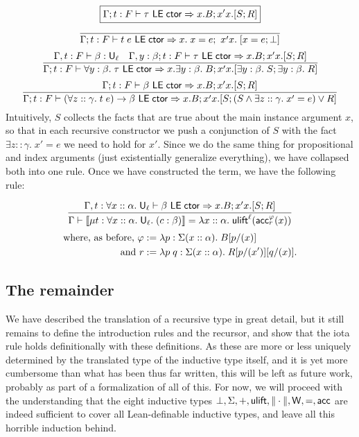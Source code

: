 $$\boxed{\Gamma;t:F\vdash \tau\LEctor\Rightarrow x.B;x'x.[S;R]}$$
$$\frac{}{\Gamma;t:F\vdash t\;e\LEctor\Rightarrow x.\;x=e;\ x'x.\;[x=e;\bot]}$$
$$\frac{\Gamma,t:F\vdash \beta:\U_\ell\quad \Gamma,y:\beta;t:F\vdash\tau\LEctor\Rightarrow x.B;x'x.[S;R]}
{\Gamma;t:F\vdash\forall y:\beta.\;\tau\LEctor\Rightarrow x.\exists y:\beta.\;B;x'x.[\exists y:\beta.\;S;\exists y:\beta.\;R]}$$
$$\frac{\Gamma;t:F\vdash\beta\LEctor\Rightarrow x.B;x'x.[S;R]}{\Gamma;t:F\vdash(\forall z::\gamma.\;t\;e)\to\beta\LEctor\Rightarrow x.B;x'x.[S;(S\land\exists z::\gamma.\;x'=e)\lor R]}$$
Intuitively, $S$ collects the facts that are true about the main instance argument $x$, so that in each recursive constructor we push a conjunction of $S$ with the fact $\exists z::\gamma.\;x'=e$ we need to hold for $x'$. Since we do the same thing for propositional and index arguments (just existentially generalize everything), we have collapsed both into one rule. Once we have constructed the term, we have the following rule:

$$\frac{\Gamma,t:\forall x::\alpha.\;\U_\ell\vdash \beta\LEctor\Rightarrow x.B;x'x.[S;R]}
{\Gamma\vdash\scott{\mu t:\forall x::\alpha.\;\U_\ell.\;(c:\beta)}=\lambda x::\alpha.\;\ulift^\ell(\acc^\vph_r(x))}$$
\vspace{-5mm}
\begin{align*}
\mbox{where, as before, }\vph&:=\lambda p:\Sigma(x::\alpha).\; B[p/(x)]\\
\mbox{and }r&:=\lambda p\;q:\Sigma(x::\alpha).\;R[p/(x')][q/(x)].
\end{align*}

\subsection{The remainder}
We have described the translation of a recursive type in great detail, but it still remains to define the introduction rules and the recursor, and show that the iota rule holds definitionally with these definitions. As these are more or less uniquely determined by the translated type of the inductive type itself, and it is yet more cumbersome than what has been thus far written, this will be left as future work, probably as part of a formalization of all of this. For now, we will proceed with the understanding that the eight inductive types $\bot,\Sigma,+,\ulift,\|\cdot\|,\W,=,\acc$ are indeed sufficient to cover all Lean-definable inductive types, and leave all this horrible induction behind.
